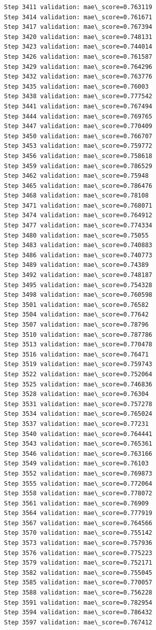 \documentclass[11pt]{article}
\begin{document}
\begin{Verbatim}[commandchars=\\\{\}]
Step 3411 validation: mae\_score=0.763119
Step 3414 validation: mae\_score=0.761671
Step 3417 validation: mae\_score=0.767394
Step 3420 validation: mae\_score=0.748131
Step 3423 validation: mae\_score=0.744014
Step 3426 validation: mae\_score=0.761587
Step 3429 validation: mae\_score=0.764296
Step 3432 validation: mae\_score=0.763776
Step 3435 validation: mae\_score=0.76003
Step 3438 validation: mae\_score=0.777542
Step 3441 validation: mae\_score=0.767494
Step 3444 validation: mae\_score=0.769765
Step 3447 validation: mae\_score=0.770409
Step 3450 validation: mae\_score=0.766707
Step 3453 validation: mae\_score=0.759772
Step 3456 validation: mae\_score=0.758618
Step 3459 validation: mae\_score=0.786529
Step 3462 validation: mae\_score=0.75948
Step 3465 validation: mae\_score=0.786476
Step 3468 validation: mae\_score=0.78108
Step 3471 validation: mae\_score=0.768071
Step 3474 validation: mae\_score=0.764912
Step 3477 validation: mae\_score=0.774334
Step 3480 validation: mae\_score=0.75055
Step 3483 validation: mae\_score=0.740883
Step 3486 validation: mae\_score=0.740773
Step 3489 validation: mae\_score=0.74389
Step 3492 validation: mae\_score=0.748187
Step 3495 validation: mae\_score=0.754328
Step 3498 validation: mae\_score=0.760598
Step 3501 validation: mae\_score=0.76582
Step 3504 validation: mae\_score=0.77642
Step 3507 validation: mae\_score=0.78796
Step 3510 validation: mae\_score=0.787786
Step 3513 validation: mae\_score=0.770478
Step 3516 validation: mae\_score=0.76471
Step 3519 validation: mae\_score=0.759743
Step 3522 validation: mae\_score=0.752064
Step 3525 validation: mae\_score=0.746836
Step 3528 validation: mae\_score=0.76304
Step 3531 validation: mae\_score=0.757278
Step 3534 validation: mae\_score=0.765024
Step 3537 validation: mae\_score=0.77231
Step 3540 validation: mae\_score=0.764441
Step 3543 validation: mae\_score=0.765361
Step 3546 validation: mae\_score=0.763166
Step 3549 validation: mae\_score=0.76103
Step 3552 validation: mae\_score=0.769873
Step 3555 validation: mae\_score=0.772064
Step 3558 validation: mae\_score=0.778072
Step 3561 validation: mae\_score=0.76909
Step 3564 validation: mae\_score=0.777919
Step 3567 validation: mae\_score=0.764566
Step 3570 validation: mae\_score=0.755142
Step 3573 validation: mae\_score=0.757936
Step 3576 validation: mae\_score=0.775223
Step 3579 validation: mae\_score=0.752171
Step 3582 validation: mae\_score=0.755045
Step 3585 validation: mae\_score=0.770057
Step 3588 validation: mae\_score=0.756228
Step 3591 validation: mae\_score=0.782954
Step 3594 validation: mae\_score=0.786432
Step 3597 validation: mae\_score=0.767412

\end{Verbatim}
\end{document}
